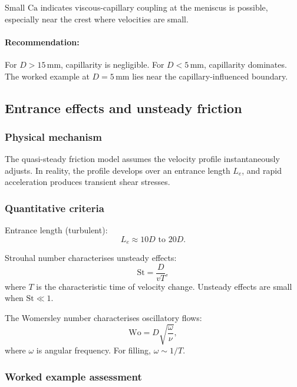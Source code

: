 \documentclass[11pt]{article}
\begin{document}
Small $\text{Ca}$ indicates viscous-capillary coupling at the meniscus is possible, especially near the crest where velocities are small.

\paragraph{Recommendation:} For $D > 15$\,mm, capillarity is negligible. For $D < 5$\,mm, capillarity dominates. The worked example at $D = 5$\,mm lies near the capillary-influenced boundary.

\subsection{Entrance effects and unsteady friction}

\subsubsection{Physical mechanism}

The quasi-steady friction model assumes the velocity profile instantaneously adjusts. In reality, the profile develops over an entrance length $L_e$, and rapid acceleration produces transient shear stresses.

\subsubsection{Quantitative criteria}

Entrance length (turbulent):
\begin{equation}
  L_e \approx 10D \text{ to } 20D.
  \label{eq:entrance}
\end{equation}

Strouhal number characterises unsteady effects:
\begin{equation}
  \text{St} = \frac{D}{vT},
  \label{eq:strouhal}
\end{equation}
where $T$ is the characteristic time of velocity change. Unsteady effects are small when $\text{St} \ll 1$.

The Womersley number characterises oscillatory flows:
\begin{equation}
  \text{Wo} = D\sqrt{\frac{\omega}{\nu}},
  \label{eq:womersley}
\end{equation}
where $\omega$ is angular frequency. For filling, $\omega \sim 1/T$.

\subsubsection{Worked example assessment}
\end{document}

